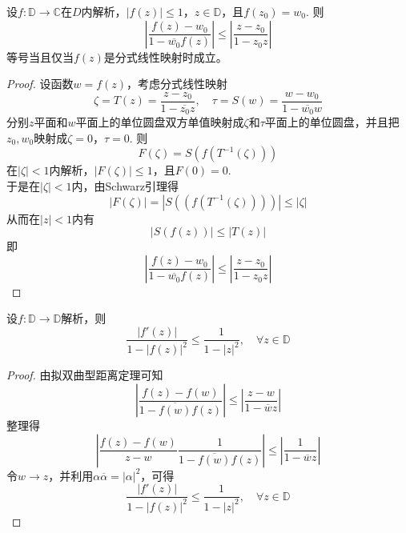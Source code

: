 \begin{theorem}

    设$f:\mathbb{D} \to \mathbb{C}$在$D$内解析，$|f(z)| \leq 1$，$z \in \mathbb{D}$，且$f(z_0) = w_0$. 则
    $$ \left| \dfrac{f(z) - w_0}{1 - \overline{w_0}f(z)} \right| \leq \left| \dfrac{z - z_0}{1 - z_0z} \right|$$
    等号当且仅当$f(z)$是分式线性映射时成立。

\end{theorem}

\begin{proof}
    
    设函数$w = f(z)$，考虑分式线性映射
    $$\zeta = T(z) = \dfrac{z - z_0}{1 - \overline{z_0}z}, \quad \tau = S(w) = \dfrac{w - w_0}{1 - \overline{w_0}w}$$
    分别$z$平面和$w$平面上的单位圆盘双方单值映射成$\zeta$和$\tau$平面上的单位圆盘，并且把$z_0, w_0$映射成$\zeta = 0$，$\tau = 0$. 则
    $$F(\zeta) = S(f(T^{-1}(\zeta)))$$
    在$|\zeta| < 1$内解析，$|F(\zeta)| \leq 1$，且$F(0) = 0$. \\
    于是在$|\zeta| < 1$内，由\textup{Schwarz}引理得
    $$|F(\zeta)| = |S((f(T^{-1}(\zeta))))| \leq |\zeta|$$
    从而在$|z| < 1$内有
    $$|S(f(z))| \leq |T(z)|$$
    即
    $$ \left| \dfrac{f(z) - w_0}{1 - \overline{w_0}f(z)} \right| \leq \left| \dfrac{z - z_0}{1 - z_0z} \right|$$

\end{proof}

\begin{theorem}

    设$f: \mathbb{D} \to \mathbb{D}$解析，则
    $$\dfrac{|f'(z)|}{1 - |f(z)|^2} \leq \dfrac{1}{1 - |z|^2}, \quad \forall z \in \mathbb{D}$$

\end{theorem}

\begin{proof}
    
    由拟双曲型距离定理可知
    $$\left| \dfrac{f(z) - f(w)}{1 - \overline{f(w)}f(z)} \right| \leq \left| \dfrac{z - w}{1 - \overline{w}z} \right|$$
    整理得
    $$\left| \dfrac{f(z) - f(w)}{z - w} \dfrac{1}{1 - \overline{f(w)}f(z)} \right| \leq \left| \dfrac{1}{1 - \overline{w}z} \right|$$
    令$w \to z$，并利用$\alpha \overline{\alpha} = | \alpha|^2$，可得
    $$\dfrac{|f'(z)|}{1 - |f(z)|^2} \leq \dfrac{1}{1 - |z|^2}, \quad \forall z \in \mathbb{D}$$
    
\end{proof}
